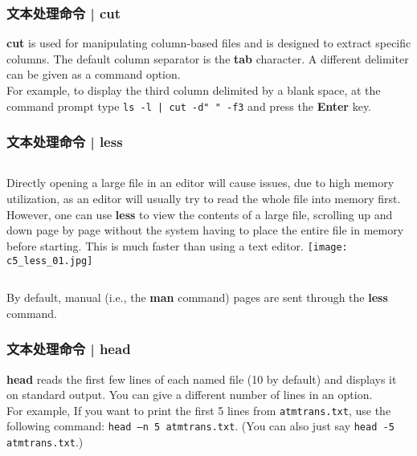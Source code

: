 \begin{frame}[fragile]
  \frametitle{文本处理命令 | cut}
  \textbf{cut} is used for manipulating column-based files and is designed to extract specific columns. The default column separator is the \textbf{tab} character. A different delimiter can be given as a command option.\\
  \vspace{0.3cm}
  For example, to display the third column delimited by a blank space, at the command prompt type \verb=ls -l | cut -d" " -f3= and press the \textbf{Enter} key.
\end{frame}

\begin{frame}
  \frametitle{文本处理命令 | less}
  \begin{columns}
  Directly opening a large file in an editor will cause issues, due to high memory utilization, as an editor will usually try to read the whole file into memory first. However, one can use \textbf{less} to view the contents of a large file, scrolling up and down page by page without the system having to place the entire file in memory before starting. This is much faster than using a text editor.
    \texttt{[image: c5\_less\_01.jpg]}
  \end{columns}
  By default, manual (i.e., the \textbf{man} command) pages are sent through the \textbf{less} command.
\end{frame}

\begin{frame}[fragile]
  \frametitle{文本处理命令 | head}
  \textbf{head} reads the first few lines of each named file (10 by default) and displays it on standard output. You can give a different number of lines in an option.\\
  \vspace{0.3cm}
  For example, If you want to print the first 5 lines from \verb|atmtrans.txt|, use the following command: \verb|head –n 5 atmtrans.txt|. (You can also just say \verb|head -5 atmtrans.txt|.)
\end{frame}


